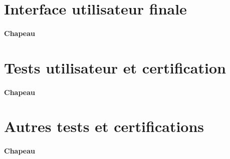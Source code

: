\section{Interface utilisateur finale} \label{sec:interfaceUtil}

\paragraph{Chapeau}


\section{Tests utilisateur et certification} \label{sec:testsUtil}

\paragraph{Chapeau}


\section{Autres tests et certifications} \label{sec:AutresTestsUtil}

\paragraph{Chapeau}
